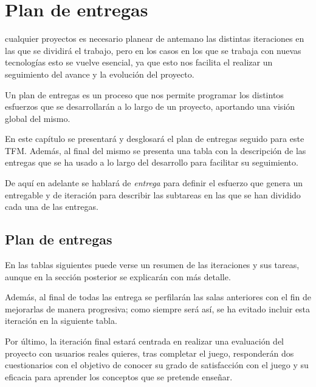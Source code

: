\chapter{Plan de entregas}
\label{chap:plan_entregas}

 cualquier proyectos es necesario planear de antemano las distintas iteraciones en las que se dividirá el trabajo, pero en los casos en los que se trabaja con nuevas tecnologías esto se vuelve esencial, ya que esto nos facilita el realizar un seguimiento del avance y la evolución del proyecto.

Un plan de entregas es un proceso que nos permite programar los distintos esfuerzos que se desarrollarán a lo largo de un proyecto, aportando  una visión global del mismo.

En este capítulo se presentará y desglosará el plan de entregas seguido para este \acs{TFM}. Además, al final del mismo se presenta una tabla con la descripción de las entregas que se ha usado a lo largo del desarrollo para facilitar su seguimiento.

De aquí en adelante se hablará de \textit{entrega} para definir el esfuerzo que genera un entregable y de iteración para describir las subtareas en las que se han dividido cada una de las entregas.

\section{Plan de entregas}

En las tablas siguientes puede verse un resumen de las iteraciones y sus tareas, aunque en la sección posterior se explicarán con más detalle.

Además, al final de todas las entrega se perfilarán las salas anteriores con el fin de mejorarlas de manera progresiva; como siempre será así, se ha evitado incluir esta iteración en la siguiente tabla.

Por último, la iteración final estará centrada en realizar una evaluación del proyecto con usuarios reales quieres, tras completar el juego, responderán dos cuestionarios con el objetivo de conocer su grado de satisfacción con el juego y su eficacia para aprender los conceptos que se pretende enseñar.

\vspace{1cm}

